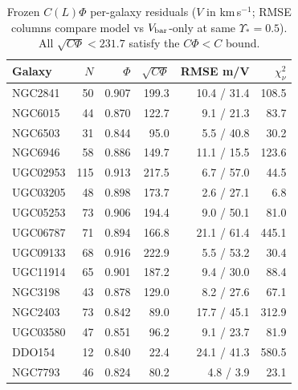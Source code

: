 \documentclass[twocolumn]{aastex631}
\begin{document}
\begin{table}[h]
\centering
\caption{Frozen $C(L)\Phi$ per-galaxy residuals ($V$ in km\,s$^{-1}$; RMSE columns compare model vs $V_{\rm bar}$-only at same $\Upsilon_*=0.5$). All $\sqrt{C\Phi}<231.7$ satisfy the $C\Phi<C$ bound.}
\label{tab:frozen15}
\begin{tabular}{lrrrrr}
\toprule
Galaxy & $N$ & $\Phi$ & $\sqrt{C\Phi}$ & RMSE m/V & $\chi^2_\nu$ \\
\midrule
NGC2841 & 50 & 0.907 & 199.3 & 10.4 / 31.4 & 108.5 \\
NGC6015 & 44 & 0.870 & 122.7 & 9.1 / 21.3 & 83.7 \\
NGC6503 & 31 & 0.844 & 95.0 & 5.5 / 40.8 & 30.2 \\
NGC6946 & 58 & 0.886 & 149.7 & 11.1 / 15.5 & 123.6 \\
UGC02953 & 115 & 0.913 & 217.5 & 6.7 / 57.0 & 44.5 \\
UGC03205 & 48 & 0.898 & 173.7 & 2.6 / 27.1 & 6.8 \\
UGC05253 & 73 & 0.906 & 194.4 & 9.0 / 50.1 & 81.0 \\
UGC06787 & 71 & 0.894 & 166.8 & 21.1 / 61.4 & 445.1 \\
UGC09133 & 68 & 0.916 & 222.9 & 5.5 / 53.2 & 30.4 \\
UGC11914 & 65 & 0.901 & 187.2 & 9.4 / 30.0 & 88.4 \\
NGC3198 & 43 & 0.878 & 129.0 & 8.2 / 27.6 & 67.1 \\
NGC2403 & 73 & 0.842 & 89.0 & 17.7 / 45.1 & 312.9 \\
UGC03580 & 47 & 0.851 & 96.2 & 9.1 / 23.7 & 81.9 \\
DDO154 & 12 & 0.840 & 22.4 & 24.1 / 41.3 & 580.5 \\
NGC7793 & 46 & 0.824 & 80.2 & 4.8 / 3.9 & 23.1 \\
\bottomrule
\end{tabular}
\end{table}
\end{document}
